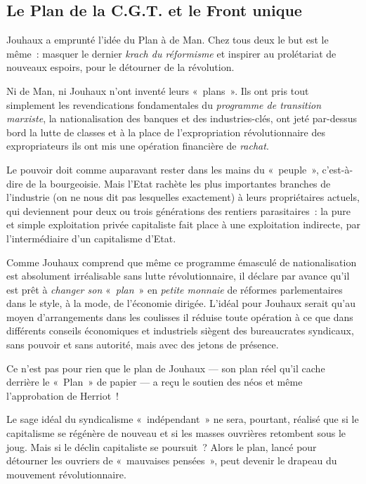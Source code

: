 \documentclass[french,twoside]{book} %
\begin{document}
\subsection[{Le Plan de la C.G.T. et le Front unique}]{Le Plan de la C.G.T. et le Front unique}
\noindent Jouhaux a emprunté l’idée du Plan à de Man. Chez tous deux le but est le même : masquer le dernier \emph{krach  du réformisme} et inspirer au prolétariat de nouveaux espoirs, pour le détourner de la révolution.\par
Ni de Man, ni Jouhaux n’ont inventé leurs « plans ». Ils ont pris tout simplement les revendications fondamentales du \emph{programme de transition marxiste}, la nationalisation des banques et des industries-clés, ont jeté par-dessus bord la lutte de classes et à la place de l’expropriation révolutionnaire des expropriateurs ils ont mis une opération financière de \emph{rachat}.\par
Le pouvoir doit comme auparavant rester dans les mains du « peuple », c’est-à-dire de la bourgeoisie. Mais l’Etat rachète les plus importantes branches de l’industrie (on ne nous dit pas lesquelles exactement) à leurs propriétaires actuels, qui deviennent pour deux ou trois générations des rentiers parasitaires : la pure et simple exploitation privée capitaliste fait place à une exploitation indirecte, par l’intermédiaire d’un capitalisme d’Etat.\par
Comme Jouhaux comprend que même ce programme émasculé de nationalisation est absolument irréalisable sans lutte révolutionnaire, il déclare par avance qu’il est prêt à \emph{changer son} « \emph{plan} » en \emph{petite monnaie} de réformes parlementaires dans le style, à la mode, de l’économie dirigée. L’idéal pour Jouhaux serait qu’au moyen d’arrangements dans les coulisses il réduise toute opération à ce que dans différents conseils économiques et industriels siègent des bureaucrates syndicaux, sans pouvoir et sans autorité, mais avec des jetons de présence.\par
Ce n’est pas pour rien que le plan de Jouhaux — son plan réel qu’il cache derrière le « Plan » de papier — a reçu le soutien des néos et même l’approbation de Herriot !\par
Le sage idéal du syndicalisme « indépendant » ne sera, pourtant, réalisé que si le capitalisme se régénère de nouveau et si les masses ouvrières retombent sous le joug. Mais si le déclin capitaliste se poursuit ? Alors le  plan, lancé pour détourner les ouvriers de « mauvaises pensées », peut devenir le drapeau du mouvement révolutionnaire.\par
\end{document}
